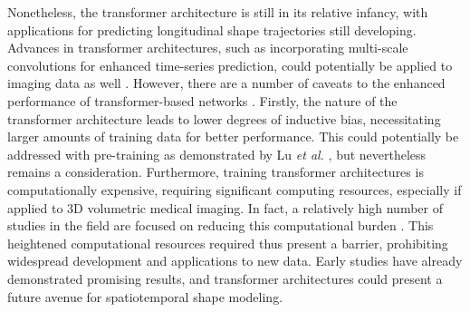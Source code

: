 		Nonetheless, the transformer architecture is still in its relative infancy, with applications for predicting longitudinal shape trajectories still developing. Advances in transformer architectures, such as incorporating multi-scale convolutions for enhanced time-series prediction, could potentially be applied to imaging data as well \cite{Wang2023}. However, there are a number of caveats to the enhanced performance of transformer-based networks \cite{Li2023}. Firstly, the nature of the transformer architecture leads to lower degrees of inductive bias, necessitating larger amounts of training data for better performance. This could potentially be addressed with pre-training as demonstrated by Lu \textit{et al.} \cite{Lu2021}, but nevertheless remains a consideration. Furthermore, training transformer architectures is computationally expensive, requiring significant computing resources, especially if applied to 3D volumetric medical imaging. In fact, a relatively high number of studies in the field are focused on reducing this computational burden \cite{Xia2023}. This heightened computational resources required thus present a barrier, prohibiting widespread development and applications to new data. Early studies have already demonstrated promising results, and transformer architectures could present a future avenue for spatiotemporal shape modeling. 		
		